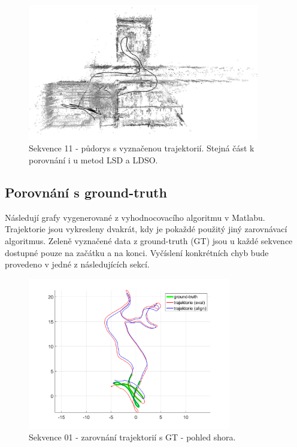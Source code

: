 \documentclass[12pt,a4paper]{report}
\begin{document}
\begin{figure}[H]
\centering
\includegraphics[width=0.9\textwidth]{img/DSO_11_top_b.png}
\caption{Sekvence 11 - půdorys s vyznačenou trajektorií. Stejná část k porovnání i u metod LSD a LDSO.}
\end{figure} 

\subsection*{Porovnání s ground-truth}
Následují grafy vygenerované z vyhodnocovacího algoritmu v Matlabu. Trajektorie jsou vykresleny dvakrát, kdy je pokaždé použitý jiný zarovnávací algoritmus. Zeleně vyznačené data z ground-truth (GT) jsou u každé sekvence dostupné pouze na začátku a na konci. Vyčíslení konkrétních chyb bude provedeno v jedné z následujících sekcí.

\begin{figure}[H]
\centering
\includegraphics[width=0.79\textwidth]{img/m_dso_01_2.png}
\caption{Sekvence 01 - zarovnání trajektorií s GT - pohled shora.}
\end{figure}
\end{document}

